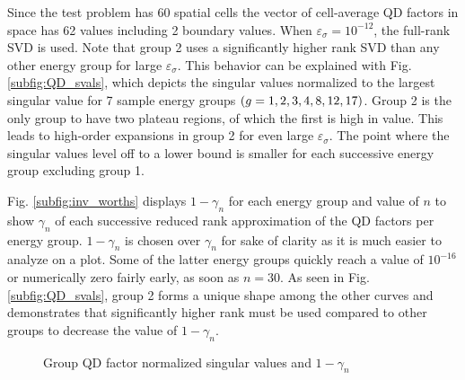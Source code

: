 	\ind Since the test problem has 60 spatial cells the vector of cell-average QD factors in space has 62 values including 2 boundary values. When $\varepsilon_\sigma=10^{-12}$, the full-rank SVD is used. Note that group 2 uses a significantly higher rank SVD than any other energy group for large $\varepsilon_\sigma$.  This behavior can be explained with Fig. \ref{subfig:QD_svals}, which depicts the singular values normalized to the largest singular value for 7 sample energy groups $\left( g=1,2,3,4,8,12,17\right)$. Group 2 is the only group to have two plateau regions, of which the first is high in value. This leads to high-order expansions in group 2 for even large $\varepsilon_\sigma$. The point where the singular values level off to a lower bound is smaller for each successive energy group excluding group 1.
	
	\ind Fig. \ref{subfig:inv_worths} displays $1-\gamma_n$ for each energy group and value of $n$ to show $\gamma_n$ of each successive reduced rank approximation of the QD factors per energy group. $1-\gamma_n$ is chosen over $\gamma_n$ for sake of clarity as it is much easier to analyze on a plot. Some of the latter energy groups quickly reach a value of $10^{-16}$ or numerically zero fairly early, as soon as $n=30$. As seen in Fig. \ref{subfig:QD_svals}, group 2 forms a unique shape among the other curves and demonstrates that significantly higher rank must be used compared to other groups to decrease the value of $1-\gamma_n$.

	\begin{figure}[ht!]
		\centering
		\caption{\label{fig:QD_sval_summary}
			Group QD factor normalized singular values and $1-\gamma_n$}
	\end{figure}
	
